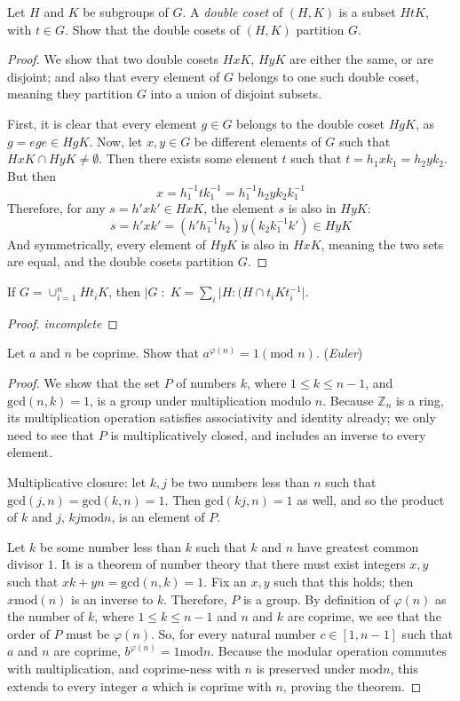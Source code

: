 \documentclass[12pt]{article}
\newcommand{\Z}{\mathbb{Z}}
\theoremstyle{definition}
\newenvironment{problem}[2][Problem]{\begin{trivlist}
\item[\hskip \labelsep {\bfseries #1}\hskip \labelsep {\bfseries #2.}]}{\end{trivlist}}
\begin{document}
\begin{problem}{3}
    Let $H$ and $K$ be subgroups of $G$. A \textit{double coset} of $(H,K)$ is a subset $HtK$, with $t \in G$. Show that the double cosets of $(H,K)$ partition $G$.
    \begin{proof}
    We show that two double cosets $HxK$, $HyK$ are either the same, or are disjoint; and also that every element of $G$ belongs to one such double coset, meaning they partition $G$ into a union of disjoint subsets.
    \par First, it is clear that every element $g \in G$ belongs to the double coset $HgK$, as $g = ege \in HgK$. Now, let $x, y \in G$ be different elements of $G$ such that $HxK \cap HyK \neq \emptyset$. Then there exists some element $t$ such that $t = h_1xk_1 = h_2yk_2$. But then 
    \[
    x = h_1^{-1}tk_1^{-1} = h_1^{-1}h_2yk_2k_1^{-1}
    \]
    Therefore, for any $s = h'xk' \in HxK$, the element $s$ is also in $HyK$:
    \[
    s = h'xk' = (h'h_1^{-1}h_2)y(k_2k_1^{-1}k') \in HyK
    \]
    And symmetrically, every element of $HyK$ is also in $HxK$, meaning the two sets are equal, and the double cosets partition $G$.
    \end{proof}
    If $G = \cup_{i = 1}^n Ht_iK$, then $\lvert G \;:\;K = \sum_i \lvert H : (H \cap t_iKt_i^{-1} \rvert$.
    \begin{proof}
	    \textit{incomplete}
    \end{proof}
\end{problem}{4}
Let $a$ and $n$ be coprime. Show that $a^{\varphi(n)} = 1 (\text{mod }n)$. (\textit{Euler})
\begin{proof}
We show that the set $P$ of numbers $k$, where $1 \leq k \leq n-1$, and $\text{gcd}(n,k) = 1$, is a group under multiplication modulo $n$. Because $\Z_n$ is a ring, its multiplication operation satisfies associativity and identity already; we only need to see that $P$ is multiplicatively closed, and includes an inverse to every element.
\par Multiplicative closure: let $k, j$ be two numbers less than $n$ such that $\text{gcd}(j,n) = \text{gcd}(k,n) = 1$. Then $\text{gcd}(kj,n) = 1$ as well, and so the product of $k$ and $j$, $kj \text{mod} n$, is an element of $P$.
\par Let $k$ be some number less than $k$ such that $k$ and $n$ have greatest common divisor $1$. It is a theorem of number theory that there must exist integers $x, y$ such that $xk + yn = \text{gcd}(n,k) = 1$. Fix an $x,y$ such that this holds; then $x \text{mod}(n)$ is an inverse to $k$. Therefore, $P$ is a group. By definition of $\varphi(n)$ as the number of $k$, where $1 \leq k \leq n-1$ and $n$ and $k$ are coprime, we see that the order of $P$ must be $\varphi(n)$. So, for every natural number $c \in [1, n-1]$ such that $a$ and $n$ are coprime, $b^{\varphi(n)} = 1 \text{mod} n$. Because the modular operation commutes with multiplication, and coprime-ness with $n$ is preserved under $\text{mod} n$, this extends to every integer $a$ which is coprime with $n$, proving the theorem.
\end{proof}
\end{document}
